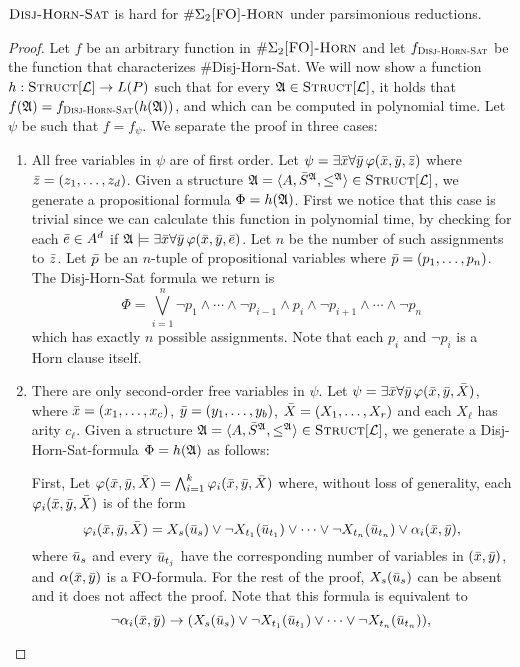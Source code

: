 \begin{theo}
	$\textsc{Disj-Horn-Sat}$ is hard for $\#\Sigma_2\textsc{[FO]-Horn}$ under parsimonious reductions. 
\end{theo} 
\begin{proof}
	Let $f$ be an arbitrary function in $\#\Sigma_2\textsc{[FO]-Horn}$ and let $f_{\textsc{Disj-Horn-Sat}}$ be the function that characterizes {\sc \#Disj-Horn-Sat}. We will now show a function $h:\textsc{Struct}[{\cal L}]\to L(P)$ such that for every ${\frak A}\in\textsc{Struct}[{\cal L}]$, it holds that $f({\frak A}) = f_{\textsc{Disj-Horn-Sat}}(h({\frak A}))$, and which can be computed in polynomial time. Let $\psi$ be such that $f = f_{\psi}$. We separate the proof in three cases:\begin{enumerate}
		\item All free variables in $\psi$ are of first order. Let $\psi = \exists \bar{x} \forall \bar{y}\,\varphi(\bar{x},\bar{y},\bar{z})$ where $\bar{z} = (z_1,\ldots,z_d)$. Given a structure ${\frak A} = \langle A, \bar{S}^{{\frak A}}, \leq^{{\frak A}} \rangle\in\textsc{Struct}[{\cal L}]$, we generate a propositional formula $\Phi = h({\frak A})$. First we notice that this case is trivial since we can calculate this function in polynomial time, by checking for each $\bar{e}\in A^d$ if ${\frak A}\models\exists\bar{x}\forall \bar{y}\,\varphi(\bar{x},\bar{y},\bar{e})$. Let $n$ be the number of such assignments to $\bar{z}$. Let $\bar{p}$ be an $n$-tuple of propositional variables where $\bar{p} = (p_1,\ldots,p_n)$. The Disj-Horn-Sat formula we return is
		\[
		\Phi = \bigvee_{i = 1}^n \neg p_1 \wedge \cdots \wedge \neg p_{i-1} \wedge p_i \wedge \neg p_{i+1} \wedge \cdots \wedge \neg p_n
		\]
		which has exactly $n$ possible assignments. Note that each $p_i$ and $\neg p_i$ is a Horn clause itself.
		
		\item There are only second-order free variables in $\psi$. Let $\psi = \exists \bar{x}\forall \bar{y}\,\varphi(\bar{x},\bar{y},\bar{X})$, where $\bar{x} = (x_1,\ldots,x_c)$, $\bar{y} = (y_1,\ldots,y_b)$, $\bar{X} = (X_1,\ldots,X_r)$ and each $X_{\ell}$ has arity $c_{\ell}$. Given a structure ${\frak A} = \langle A, \bar{S}^{{\frak A}}, \leq^{{\frak A}} \rangle\in\textsc{Struct}[{\cal L}]$, we generate a Disj-Horn-Sat-formula $\Phi = h({\frak A})$ as follows:
		
		First, Let $\varphi(\bar{x},\bar{y},\bar{X}) = \bigwedge_{i = 1}^k \varphi_{i}(\bar{x},\bar{y},\bar{X})$ where, without loss of generality, each $\varphi_{i}(\bar{x},\bar{y},\bar{X})$ is of the form
		\[
		\varphi_{i}(\bar{x},\bar{y},\bar{X}) = X_s(\bar{u}_{s}) \vee \neg X_{t_1}(\bar{u}_{t_1}) \vee \cdots \vee \neg X_{t_n}(\bar{u}_{t_n}) \vee \alpha_i(\bar{x},\bar{y}),
		\]
		where $\bar{u}_{s}$ and every $\bar{u}_{t_j}$ have the corresponding number of variables in $(\bar{x},\bar{y})$, and $\alpha(\bar{x},\bar{y})$ is a FO-formula. For the rest of the proof, $X_s(\bar{u}_s)$ can be absent and it does not affect the proof. Note that this formula is equivalent to
		\[
		\neg\alpha_i(\bar{x},\bar{y}) \to (X_s(\bar{u}_{s}) \vee \neg X_{t_1}(\bar{u}_{t_1}) \vee \cdots \vee \neg X_{t_n}(\bar{u}_{t_n})),
		\]
		

\end{enumerate}
\end{proof}
